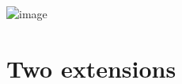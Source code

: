 \documentclass[10pt,mathserif]{beamer}
\begin{document}
\begin{frame}
\begin{center}
\includegraphics<1->[width=4in]{figures/limno_bgape_ls}\\[0.5em]
\color{white}
\color{black}
\end{center}
\end{frame}

\section{Two extensions}
\end{document}
